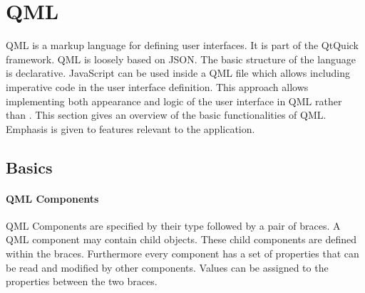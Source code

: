 \section[QML \textsuperscript{Novotny}]{QML}
\label{sec:QML}
QML is a markup language for defining user interfaces. It is part of the QtQuick framework. QML is loosely based on JSON. The basic structure of the language is declarative. JavaScript can be used inside a QML file which allows including imperative code in the user interface definition. This approach allows implementing both appearance and logic of the user interface in QML rather than \cpp. This section gives an overview of the basic functionalities of QML. Emphasis is given to features relevant to the application.
\subsection{Basics}
\paragraph{QML Components}
QML Components are specified by their type followed by a pair of braces. A QML component may contain child objects. These child components are defined within the braces. Furthermore every component has a set of properties that can be read and modified by other components. Values can be assigned to the properties between the two braces.
